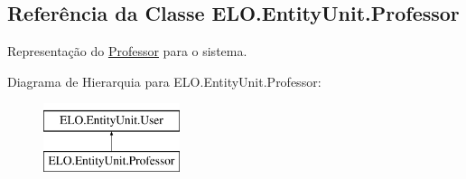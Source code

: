 \hypertarget{classELO_1_1EntityUnit_1_1Professor}{\subsection{Referência da Classe E\-L\-O.\-Entity\-Unit.\-Professor}
\label{classELO_1_1EntityUnit_1_1Professor}
}


Representação do \hyperlink{classELO_1_1EntityUnit_1_1Professor}{Professor} para o sistema.  


Diagrama de Hierarquia para E\-L\-O.\-Entity\-Unit.\-Professor\-:\begin{figure}[H]
\begin{center}
\leavevmode
\includegraphics[height=2.000000cm]{d5/df1/classELO_1_1EntityUnit_1_1Professor}
\end{center}
\end{figure}
